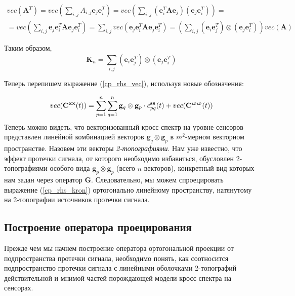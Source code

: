 \begin{multline}
    vec\left(\mathbf{A}^T\right) = vec\left(\sum_{i,j} A_{i,j} \mathbf{e}_j \mathbf{e}_i^T\right) =
    vec\left(\sum_{i,j} (\mathbf{e}_i^T \mathbf{A} \mathbf{e}_j)(\mathbf{e}_j \mathbf{e}_i^T)\right) = \\
  = vec\left(\sum_{i,j} \mathbf{e}_j \mathbf{e}_i^T \mathbf{A} \mathbf{e}_j\mathbf{e}_i^T\right) =
    \sum_{i,j} vec\left(\mathbf{e}_j \mathbf{e}_i^T \mathbf{A} \mathbf{e}_j \mathbf{e}_i^T\right) =
    \left(\sum_{i,j} (\mathbf{e}_i \mathbf{e}_j^T) \otimes (\mathbf{e}_j \mathbf{e}_i^T) \right)vec(\mathbf{A})
\end{multline}

Таким образом,
\begin{equation}
    \mathbf{K}_n =  \sum_{i,j} (\mathbf{e}_i \mathbf{e}_j^T) \otimes (\mathbf{e}_j \mathbf{e}_i^T)
    \label{eq:commutation_matrix_formula}
\end{equation}

Теперь перепишем выражение (\ref{cp_rhs_vec}), используя новые обозначения:

\begin{equation}
    vec(\mathbf{C}^{\mathbf{x x}}(t)) = \sum\limits_{p=1}^n\sum\limits_{q=1}^n
    \mathbf{g}_q\otimes \mathbf{g}_p \cdot c_{pq}^{\mathbf{ss}}(t) + vec(\mathbf{C}^{\mathbf{\upomega \upomega}}(t))
    \label{cp_rhs_kron}
\end{equation}
Теперь можно видеть, что векторизованный кросс-спектр на уровне сенсоров представлен линейной
комбинацией векторов $\mathbf{g}_q \otimes \mathbf{g}_p$ в $m^2$-мерном векторном пространстве.
Назовем эти векторы \emph{2-топографиями}.
Нам уже известно, что эффект протечки сигнала, от которого необходимо избавиться,
обусловлен 2-топографиями особого вида $\mathbf{g}_p \otimes \mathbf{g}_p$ (всего $n$ векторов),
конкретный вид которых нам задан через оператор $\mathbf{G}$.
Следовательно, мы можем спроецировать выражение (\ref{cp_rhs_kron}) ортогонально линейному пространству,
натянутому на 2-топографии источников протечки сигнала.

\subsection{Построение оператора проецирования}
\label{sec:psiicos_projection}
Прежде чем мы начнем построение оператора ортогональной проекции от подпространства протечки сигнала,
необходимо понять, как соотносится подпространство протечки сигнала с линейными оболочками
2-топографий действительной и мнимой частей порождающей модели кросс-спектра на сенсорах.


